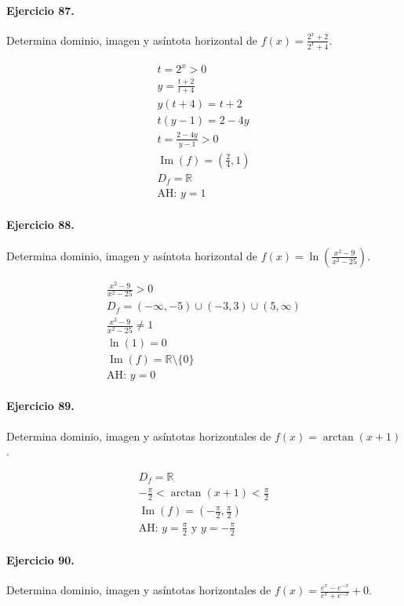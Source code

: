 \documentclass[11pt,a4paper]{article}
\begin{document}
\paragraph{Ejercicio 87.} Determina dominio, imagen y asíntota horizontal de $f(x)=\frac{2^x+2}{2^x+4}$. 

\[
\begin{aligned}
t=2^x>0\\
y=\frac{t+2}{t+4}\\
y(t+4)=t+2\\
t(y-1)=2-4y\\
t=\frac{2-4y}{y-1}>0\\
\operatorname{Im}(f)=(\frac{2}{4},1)\\
D_f=\mathbb{R}\\
\text{{AH: }}y=1
\end{aligned}
\]


\paragraph{Ejercicio 88.} Determina dominio, imagen y asíntota horizontal de $f(x)=\ln\left(\frac{x^2-9}{x^2-25}\right)$.

\[
\begin{aligned}
\frac{x^2-9}{x^2-25} >0\\
D_f=(-\infty,-5)\cup(-3,3)\cup(5,\infty)\\
\frac{x^2-9}{x^2-25}\ne1\\
\ln(1)=0\\
\operatorname{Im}(f)=\mathbb{R}\setminus\{0\}\\
\text{{AH: }}y=0
\end{aligned}
\]


\paragraph{Ejercicio 89.} Determina dominio, imagen y asíntotas horizontales de $f(x)=\arctan(x+1)$.

\[
\begin{aligned}
D_f=\mathbb{R}\\
-\frac{\pi}{2}<\arctan(x+1)<\frac{\pi}{2}\\
\operatorname{Im}(f)=\left(-\frac{\pi}{2},\frac{\pi}{2}\right)\\
\text{AH: }y=\frac{\pi}{2}\text{ y }y=-\frac{\pi}{2}
\end{aligned}
\]


\paragraph{Ejercicio 90.} Determina dominio, imagen y asíntotas horizontales de $f(x)=\frac{e^x-e^{-x}}{e^x+e^{-x}}+0$.
\end{document}
